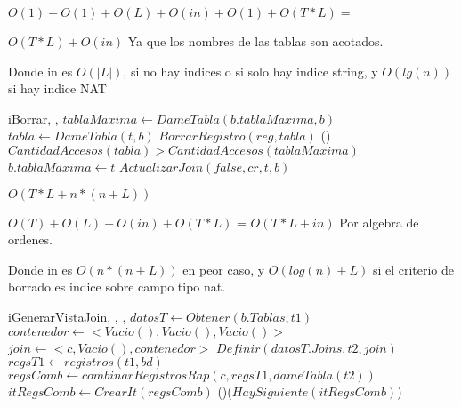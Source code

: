 \begin{Algoritmos}
{$O(1) + O(1) + O(L) + O(in) + O(1) + O(T*L) =$

$O(T*L) + O(in)$ Ya que los nombres de las tablas son acotados.

Donde in es $O(|L|)$, si no hay indices o si solo hay indice string, y $O(lg(n))$ si hay indice NAT} %
		
\begin{algoritmo}{iBorrar}{, , }{}
	$tablaMaxima \gets DameTabla(b.tablaMaxima, b)$ 
   	$tabla \gets DameTabla(t, b)$ 
   	$BorrarRegistro(reg, tabla)$ 
    \If(){$CantidadAccesos(tabla) > CantidadAccesos(tablaMaxima)$}{		    	    			$b.tablaMaxima \gets t$ 
    }
	$ActualizarJoin(false, cr,t,b)$ 
    
\end{algoritmo}
\datosAlgoritmo{} %
{} %
{} %
{$O(T*L + n*(n+L)) $} %
{$O(T) + O(L) + O(in) + O(T*L)$ = $O(T*L + in)$ Por algebra de ordenes.

Donde in es $O(n *(n + L))$ en peor caso, y $O(log(n) + L)$ si el criterio de borrado es indice sobre campo tipo nat. } %

\begin{algoritmo}{iGenerarVistaJoin}{, , , }{}
    $datosT \gets Obtener(b.Tablas, t1)$ 
   	$contenedor \gets <Vacio(), Vacio(), Vacio() > $ 
	$join \gets <c, Vacio(), contenedor > $ 
	$Definir(datosT.Joins, t2, join) $ 
    $regsT1 \gets registros(t1, bd)$ 
    $regsComb \gets combinarRegistrosRap(c, regsT1, dameTabla(t2))$ 
    $itRegsComb \gets CrearIt(regsComb) $ 
    \While(){($HaySiguiente(itRegsComb)$)}{
    
}
\end{algoritmo}
\end{Algoritmos}
